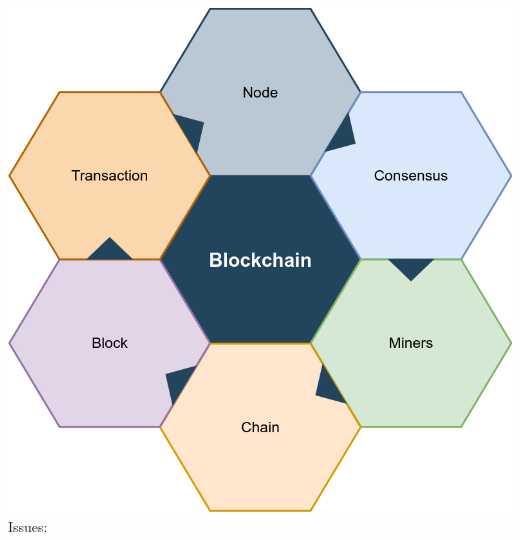 \documentclass{IEEEtran}
\begin{document}
      \includegraphics[width=\linewidth]{Resources/BlockchainCycle.png}
      Issues:
\end{document}
